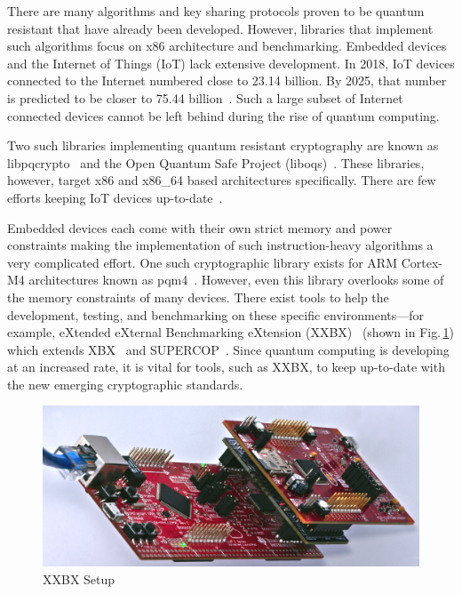 \documentclass[10pt]{article}
\begin{document}
There are many algorithms and key sharing protocols proven to be quantum resistant that have 
already been developed. However, libraries that implement such algorithms focus on x86 
architecture and benchmarking. Embedded devices and the Internet of Things (IoT) lack extensive 
development. In 2018, IoT devices connected to the Internet numbered close to 23.14 billion. 
By 2025, that number is predicted to be closer to 75.44 billion~\cite{tobefound}.
Such a large subset of Internet 
connected devices cannot be left behind during the rise of quantum computing.

Two such libraries implementing quantum resistant cryptography are known as libpqcrypto~\cite{libpqcrypto} 
and the Open Quantum Safe Project (liboqs)~\cite{openquantumsave}. These libraries, however, target 
x86 and x86\_64 based architectures specifically. There are few efforts keeping IoT devices 
up-to-date~\cite{MALINA2018462}.

Embedded devices each come with their own strict memory and power constraints making the 
implementation of such instruction-heavy algorithms a very complicated effort. One such 
cryptographic library exists for ARM Cortex-M4 architectures known as pqm4~\cite{PQM4}. 
However, even this library overlooks some of the memory constraints of many devices. 
There exist tools to help the development, testing, and benchmarking on these specific 
environments—for example, eXtended eXternal Benchmarking eXtension (XXBX)~\cite{PK15,Kap16}
(shown in Fig.\,\ref{fig:xxbx_setup}) which extends 
XBX~\cite{xbx} and SUPERCOP~\cite{SUP06}.  Since quantum computing is developing at an increased rate, 
it is vital for tools, such as XXBX, to keep up-to-date with the 
new emerging cryptographic standards.

\begin{figure}[ht]
    \centering
    \includegraphics[scale=1.0]{../figures/xxbx-tilted}
    \caption{XXBX Setup}
    \label{fig:xxbx_setup}
\end{figure}
\end{document}
